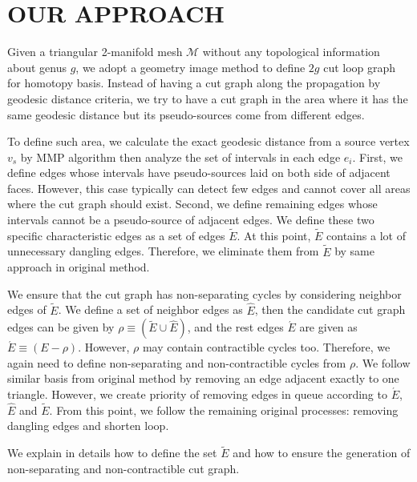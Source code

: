\documentclass[a4paper,twoside]{article}
\begin{document}
\section{\uppercase{Our Approach}}
\label{sec:our approach}
\noindent Given a triangular 2-manifold mesh $\mathscr{M}$ without any topological information about genus $g$, we adopt a geometry image method \cite{Gu:2002:GI:566654.566589} to define $2g$ cut loop graph for homotopy basis. Instead of having a cut graph along the propagation by geodesic distance criteria, we try to have a cut graph in the area where it has the same geodesic distance but its pseudo-sources come from different edges.

To define such area, we calculate the exact geodesic distance from a source vertex $v_{s}$ by MMP algorithm \cite{Mitchell:1987:DGP:33367.33372} then  analyze the set of intervals in each edge $e_i$. First, we define edges whose intervals have pseudo-sources laid on both side of adjacent faces. However, this case typically can detect few edges and cannot cover all areas where the cut graph should exist. Second, we define remaining edges whose intervals cannot be a pseudo-source of adjacent edges. We define these two specific characteristic edges as a set of edges $\tilde{E}$. At this point, $\tilde{E}$ contains a lot of unnecessary dangling edges. Therefore, we eliminate them from $\tilde{E}$ by same approach in original method.

We ensure that the cut graph has non-separating cycles by considering neighbor edges of $\tilde{E}$. We define a set of neighbor edges as $\hat{E}$, 
then the candidate cut graph edges can be given by $\rho \equiv (\tilde{E} \cup \hat{E})$, and the rest edges $\acute{E}$ are given as $\acute{E} \equiv (E - \rho)$. However, $\rho$ may contain contractible cycles too. Therefore, we again need to define non-separating and non-contractible cycles from $\rho$. We follow similar basis from original method by removing an edge adjacent exactly to one triangle. However, we create priority of removing edges in queue according to $\acute{E}$,  $\hat{E}$ and $\tilde{E}$. From this point, we follow the remaining original processes: removing dangling edges and shorten loop.

We explain in details how to define the set $\tilde{E}$ and how to ensure the generation of non-separating and non-contractible cut graph.
\end{document}
